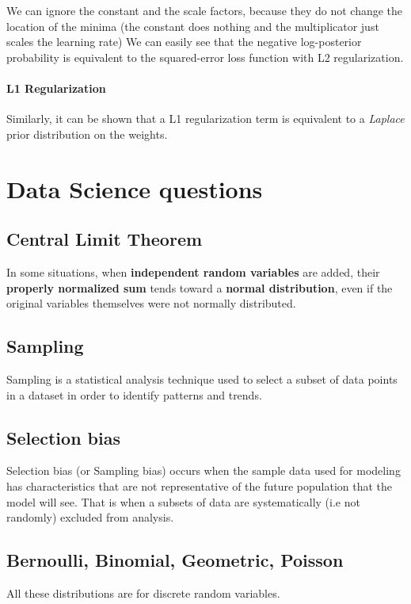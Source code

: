 We can ignore the constant and the scale factors, because they do not change the location of the minima (the constant does nothing and the multiplicator just scales the learning rate)
We can easily see that the negative log-posterior probability is equivalent to the squared-error loss function with L2 regularization.

\paragraph{L1 Regularization}
Similarly, it can be shown that a L1 regularization term is equivalent to a \textit{Laplace} prior distribution on the weights.



\section{Data Science questions}

\subsection{Central Limit Theorem}
In some situations, when \textbf{independent random variables} are added, their \textbf{properly normalized sum} tends toward a \textbf{normal distribution}, even if the original variables themselves were not normally distributed.

\subsection{Sampling}
Sampling is a statistical analysis technique used to select a subset of data points in a dataset in order to identify patterns and trends.

\subsection{Selection bias}
Selection bias (or Sampling bias) occurs when the sample data used for modeling has characteristics that are not representative of the future population that the model will see. That is when a subsets of data are systematically (i.e not randomly) excluded from analysis.

\subsection{Bernoulli, Binomial, Geometric, Poisson}
All these distributions are for discrete random variables.


